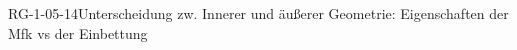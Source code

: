 
\begin{REM}{RG-1-05-14}{Unterscheidung zw. Innerer und äußerer Geometrie: Eigenschaften der Mfk vs der Einbettung}
\end{REM}
